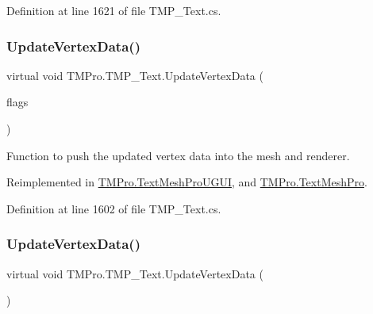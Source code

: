 Definition at line 1621 of file T\+M\+P\+\_\+\+Text.\+cs.

\mbox{\label{class_t_m_pro_1_1_t_m_p___text_ae4079b9679758f2a086a0e9f63893475}} 
\subsubsection{\texorpdfstring{UpdateVertexData()}{UpdateVertexData()}\hspace{0.1cm}{\footnotesize\ttfamily [1/2]}}
{\footnotesize\ttfamily virtual void T\+M\+Pro.\+T\+M\+P\+\_\+\+Text.\+Update\+Vertex\+Data (\begin{DoxyParamCaption}\item[{\mbox{\hyperlink{namespace_t_m_pro_a517464fab2ef7ff5b9658d2acaf49a57}{T\+M\+P\+\_\+\+Vertex\+Data\+Update\+Flags}}}]{flags }\end{DoxyParamCaption})\hspace{0.3cm}{\ttfamily [virtual]}}



Function to push the updated vertex data into the mesh and renderer. 



Reimplemented in \mbox{\hyperlink{class_t_m_pro_1_1_text_mesh_pro_u_g_u_i_a2fb671e18fda5d2e996ed13347fefffa}{T\+M\+Pro.\+Text\+Mesh\+Pro\+U\+G\+UI}}, and \mbox{\hyperlink{class_t_m_pro_1_1_text_mesh_pro_a0011d887bd47e96fc4d12ee9d6c486f3}{T\+M\+Pro.\+Text\+Mesh\+Pro}}.



Definition at line 1602 of file T\+M\+P\+\_\+\+Text.\+cs.

\mbox{\label{class_t_m_pro_1_1_t_m_p___text_a63f0f98478ef7b8c9a314f74c9836e39}} 
\subsubsection{\texorpdfstring{UpdateVertexData()}{UpdateVertexData()}\hspace{0.1cm}{\footnotesize\ttfamily [2/2]}}
{\footnotesize\ttfamily virtual void T\+M\+Pro.\+T\+M\+P\+\_\+\+Text.\+Update\+Vertex\+Data (\begin{DoxyParamCaption}{ }\end{DoxyParamCaption})\hspace{0.3cm}{\ttfamily [virtual]}}




